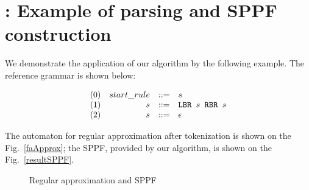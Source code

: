 \appendix

\section{\appendixname: Example of parsing and SPPF construction}\label{example}

We demonstrate the application of our algorithm by the following example. The reference grammar is shown below:

$$
\begin{array}{crcl}
(0)& start\_rule &::=& s \\
(1)& s & ::= & \mbox{\texttt{LBR }} s \mbox{\texttt{ RBR }} s\\
(2)& s & ::= &\epsilon
\end{array}
$$

The automaton for regular approximation after tokenization is shown on the Fig.~\ref{faApprox}; the 
SPPF, provided by our algorithm, is shown on the Fig.~\ref{resultSPPF}.

 \begin{figure}[!ht]
   \hfill
    \caption{Regular approximation and SPPF}
    \label{fig:SPPFforReg}
 \end{figure}

